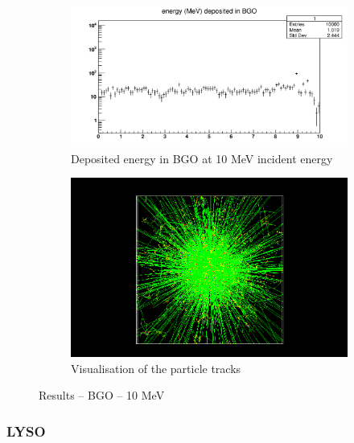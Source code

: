 \documentclass{article}
\begin{document}
\begin{figure}[H]
\centering
\begin{subfigure}{.5\textwidth}
  \centering
  \includegraphics[width=\linewidth]{images/task1/BGO_10MeV.png}
  \caption{Deposited energy in BGO at 10 MeV incident energy}
\end{subfigure}%
\begin{subfigure}{.5\textwidth}
  \centering
  \includegraphics[width=\linewidth]{images/task1/BGO_10MeV_10000.png}
  \caption{Visualisation of the particle tracks}
\end{subfigure}
\caption{Results – BGO – 10 MeV}
\end{figure}


\subsubsection{LYSO}
\end{document}
